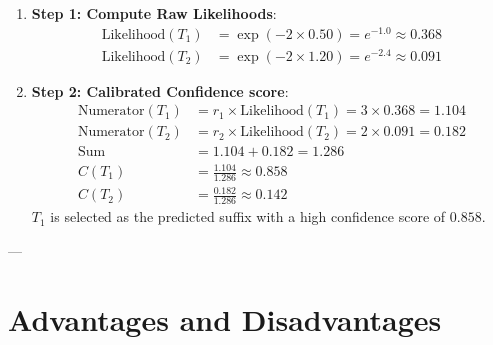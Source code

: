 \documentclass{article}
\begin{document}
\begin{enumerate}
    \item \textbf{Step 1: Compute Raw Likelihoods}:
    \begin{align*}
        \text{Likelihood}(T_1) &= \exp(-2 \times 0.50) = e^{-1.0} \approx 0.368 \\
        \text{Likelihood}(T_2) &= \exp(-2 \times 1.20) = e^{-2.4} \approx 0.091
    \end{align*}
    
    \item \textbf{Step 2: Calibrated Confidence score}:
    \begin{align*}
        \text{Numerator}(T_1) &= r_1 \times \text{Likelihood}(T_1) = 3 \times 0.368 = 1.104 \\
        \text{Numerator}(T_2) &= r_2 \times \text{Likelihood}(T_2) = 2 \times 0.091 = 0.182 \\
        \text{Sum} &= 1.104 + 0.182 = 1.286 \\
        C(T_1) &= \frac{1.104}{1.286} \approx 0.858 \\
        C(T_2) &= \frac{0.182}{1.286} \approx 0.142
    \end{align*}
    $T_1$ is selected as the predicted suffix with a high confidence score of $0.858$.
\end{enumerate}

---

\section{Advantages and Disadvantages}
\end{document}
